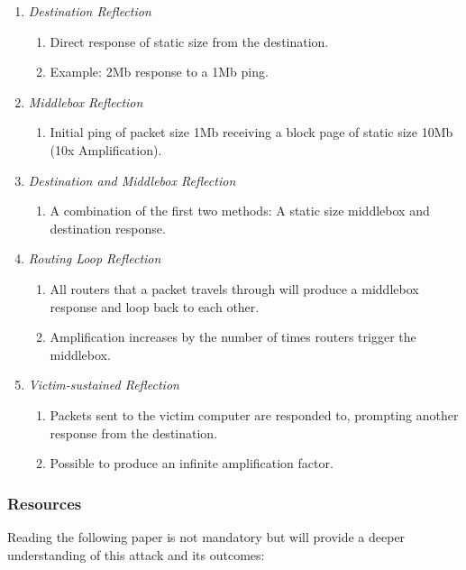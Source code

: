 \documentclass[letterpaper,12pt]{report}
\begin{document}
\begin{enumerate}
    \item \textit{Destination Reflection}
    \begin{enumerate}
        \item Direct response of static size from the destination.
        \item Example: 2Mb response to a 1Mb ping.
    \end{enumerate}
    \item \textit{Middlebox Reflection}
    \begin{enumerate}
        \item Initial ping of packet size 1Mb receiving a block page of static size 10Mb (10x Amplification).
    \end{enumerate}
    \item \textit{Destination and Middlebox Reflection}
    \begin{enumerate}
        \item A combination of the first two methods: A static size middlebox and destination response.
    \end{enumerate}
    \item \textit{Routing Loop Reflection}
    \begin{enumerate}
        \item All routers that a packet travels through will produce a middlebox response and loop back to each other.
        \item Amplification increases by the number of times routers trigger the middlebox.
    \end{enumerate}
    \item \textit{Victim-sustained Reflection}
    \begin{enumerate}
        \item Packets sent to the victim computer are responded to, prompting another response from the destination.
        \item Possible to produce an infinite amplification factor.
    \end{enumerate}
\end{enumerate}

\subsubsection*{Resources}

Reading the following paper is not mandatory but will provide a deeper understanding of this attack and its outcomes:
\end{document}
